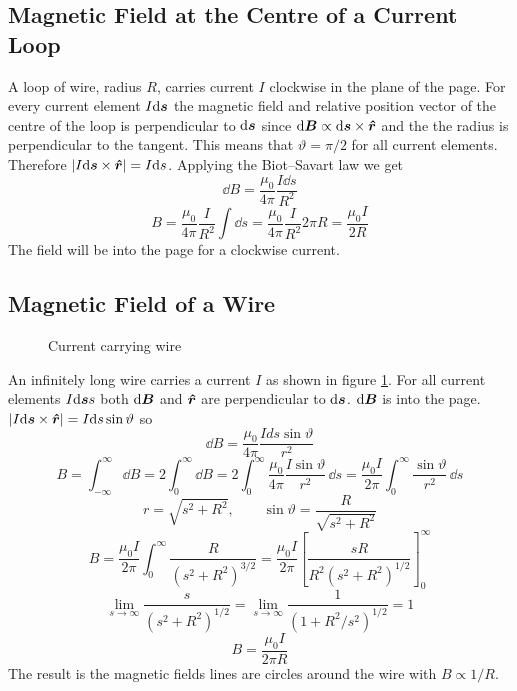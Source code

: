 \documentclass{article}
\begin{document}
    \subsection{Magnetic Field at the Centre of a Current Loop}
    A loop of wire, radius \(R\), carries current \(I\) clockwise in the plane of the page.
    For every current element \(I\dd\bm{s}\) the magnetic field and relative position vector of the centre of the loop is perpendicular to \(\dd\bm{s}\) since \(\dd\bm{B} \propto \dd \bm{s}\times\bm{\hat{r}}\) and the the radius is perpendicular to the tangent.
    This means that \(\vartheta = \pi/2\) for all current elements.
    Therefore \(|I\dd\bm{s} \times\bm{\hat{r}}| = I\dd s\).
    Applying the Biot--Savart law we get
    \[\dd B = \frac{\mu_0}{4\pi}\frac{I\dd s}{R^2}\]
    \[B = \frac{\mu_0}{4\pi}\frac{I}{R^2}\int\dd s = \frac{\mu_0}{4\pi}\frac{I}{R^2}2\pi R = \frac{\mu_0I}{2R}\]
    The field will be into the page for a clockwise current.
    
    \subsection{Magnetic Field of a Wire}
    \begin{figure}[ht]
        \centering
        \caption{Current carrying wire}
        \label{fig:current carrying wire}
    \end{figure}
    An infinitely long wire carries a current \(I\) as shown in figure \ref{fig:current carrying wire}.
    For all current elements \(I\dd\bm{s} s\) both \(\dd\bm{B}\) and \(\bm{\hat{r}}\) are perpendicular to \(\dd\bm{s}\).
    \(\dd\bm{B}\) is into the page.
    \(|I\dd\bm{s}\times\bm{\hat{r}}| = I\dd s\sin\vartheta\) so
    \[\dd B = \frac{\mu_0}{4\pi}\frac{Ids\sin\vartheta}{r^2}\]
    \[B = \int_{-\infty}^{\infty}\dd B = 2\int_0^\infty\dd B = 2\int_0^\infty \frac{\mu_0}{4\pi}\frac{I\sin\vartheta}{r^2}\,\dd s = \frac{\mu_0 I}{2\pi}\int_0^\infty\frac{\sin\vartheta}{r^2}\,\dd s\]
    \[r = \sqrt{s^2 + R^2},\qquad \sin\vartheta = \frac{R}{\sqrt{s^2 + R^2}}\]
    \[B = \frac{\mu_0 I}{2\pi}\int_0^\infty\frac{R}{(s^2 + R^2)^{3/2}} = \frac{\mu_0 I}{2\pi}\left[\frac{sR}{R^2(s^2 + R^2)^{1/2}}\right]_0^\infty\]
    \[\lim_{s\to\infty}\frac{s}{(s^2 + R^2)^{1/2}} = \lim_{s\to\infty}\frac{1}{(1 + R^2/s^2)^{1/2}} = 1\]
    \[B = \frac{\mu_0 I}{2\pi R}\]
    The result is the magnetic fields lines are circles around the wire with \(B\propto 1/R\).
    
\end{document}
